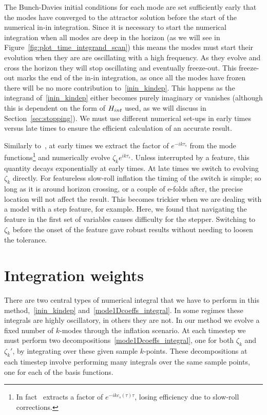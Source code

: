     The Bunch-Davies initial conditions for each mode are set sufficiently early that the modes
    have converged to the attractor solution before the start of the numerical in-in integration.
    Since it is necessary to start the numerical integration when all modes are deep
    in the horizon (as we will see in Figure~\ref{fig:plot_time_integrand_scan})
    this means the modes must start their evolution when they are are oscillating
    with a high frequency. As they evolve
    and cross the horizon they will stop oscillating and eventually freeze-out.
    This freeze-out marks the end of the in-in integration,
    as once all the modes have frozen there will be no more contribution to~\eqref{inin_kindep}.
    This happens as the integrand of~\eqref{inin_kindep} either becomes purely
    imaginary or vanishes (although this is dependent on the form of $H_{int}$ used,
    as we will discuss in Section~\ref{sec:stopping}).
    We must use different numerical set-ups in early times versus late times to
    ensure the efficient calculation of an accurate result.


Similarly to~\cite{Funakoshi}, at early times we extract the factor of $e^{-ik\tau_s}$ from the mode
functions\footnote{
    In fact~\cite{Funakoshi} extracts a factor of $e^{-ikc_s(\tau)\tau}$, losing efficiency
    due to slow-roll corrections.
}
and numerically evolve $\zeta_ke^{ik\tau_s}$.
Unless interrupted by a feature, this quantity decays exponentially
at early times.
At late times we switch to evolving $\zeta_k$ directly.
For featureless slow-roll inflation the timing of the switch is simple;
so long as it is around horizon crossing, or a couple of e-folds after,
the precise location will not affect the result.
This becomes trickier when we are dealing with a model with
a step feature, for example.
Here, we found that navigating the feature in the first set of variables
causes difficulty for the stepper.
Switching to $\zeta_k$ before the onset of the feature
gave robust results without needing to loosen the tolerance.


\section{Integration weights}
    There are two central types of numerical integral that we have to perform
    in this method,~\eqref{inin_kindep} and~\eqref{mode1Dcoeffs_integral}.
    In some regimes these integrals are highly oscillatory, in others they are not.
    In our method we evolve a fixed number of $k$-modes through the inflation scenario.
    At each timestep we must perform two decompositions~\eqref{mode1Dcoeffs_integral},
    one for both $\zeta_k$ and $\zeta_k'$,
    by integrating over these given sample $k$-points.
    These decompositions at each timestep involve performing many integrals over the same
    sample points, one for each of the basis functions.


